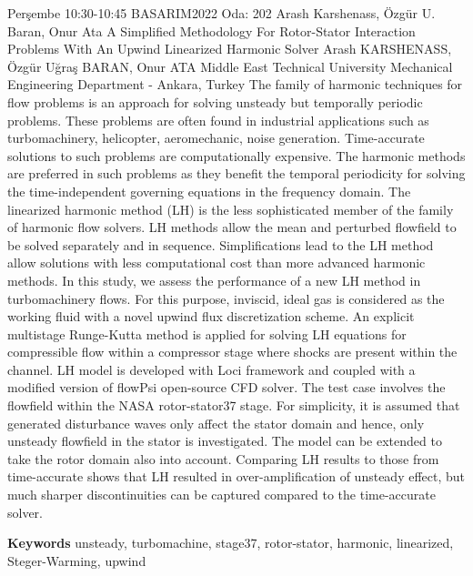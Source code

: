 
    \begin{abstract_basarim}
    {Perşembe 10:30-10:45}
    {BASARIM2022}
    {Oda: 202}
    {Arash Karshenass, Özgür U. Baran, Onur Ata}
    {A Simplified Methodology For Rotor-Stator Interaction Problems With An Upwind Linearized Harmonic Solver}
    {%
    Arash KARSHENASS, Özgür Uğraş BARAN, Onur ATA}
    {%
    }
    {%
    Middle East Technical University Mechanical Engineering Department - Ankara, Turkey}
    The family of harmonic techniques for flow problems is an approach for solving unsteady but temporally periodic problems. These problems are often found in industrial applications such as turbomachinery, helicopter, aeromechanic, noise generation. Time-accurate solutions to such problems are computationally expensive. The harmonic methods are preferred in such problems as they benefit the temporal periodicity for solving the time-independent governing equations in the frequency domain. The linearized harmonic method (LH) is the less sophisticated member of the family of harmonic flow solvers. LH methods allow the mean and perturbed flowfield to be solved separately and in sequence. Simplifications lead to the LH method allow solutions with less computational cost than more advanced harmonic methods. In this study, we assess the performance of a new LH method in turbomachinery flows. For this purpose, inviscid, ideal gas is considered as the working fluid with a novel upwind flux discretization scheme. An explicit multistage Runge-Kutta method is applied for solving LH equations for compressible flow within a compressor stage where shocks are present within the channel. LH model is developed with Loci framework and coupled with a modified version of flowPsi open-source CFD solver. The test case involves the flowfield within the NASA rotor-stator37 stage. For simplicity, it is assumed that generated disturbance waves only affect the stator domain and hence, only unsteady flowfield in the stator is investigated. The model can be extended to take the rotor domain also into account. Comparing LH results to those from time-accurate shows that LH resulted in over-amplification of unsteady effect, but much sharper discontinuities can be captured compared to the time-accurate solver. 
    
        \textbf{Keywords} \newline{}unsteady, turbomachine, stage37, rotor-stator, harmonic, linearized, Steger-Warming, upwind
    \end{abstract_basarim}
    
